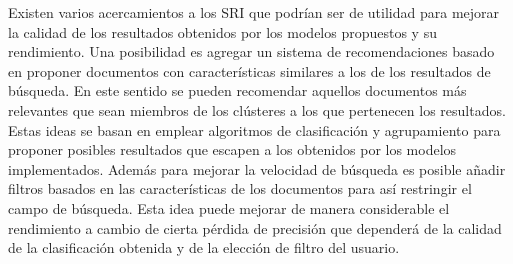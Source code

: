 \documentclass[12pt]{llncs}
\begin{document}
Existen varios acercamientos a los SRI que podrían ser de utilidad para mejorar la calidad de los resultados obtenidos por los modelos propuestos y su rendimiento. Una posibilidad es agregar un sistema de recomendaciones basado en proponer documentos con características similares a los de los resultados de búsqueda. En este sentido se pueden recomendar aquellos documentos más relevantes que sean miembros de los clústeres a los que pertenecen los resultados. Estas ideas se basan en emplear algoritmos de clasificación y agrupamiento para proponer posibles resultados que escapen a los obtenidos por los modelos implementados. Además para mejorar la velocidad de búsqueda es posible añadir filtros basados en las características de los documentos para así restringir el campo de búsqueda. Esta idea puede mejorar de manera considerable el rendimiento a cambio de cierta pérdida de precisión que dependerá de la calidad de la clasificación obtenida y de la elección de filtro del usuario.


 

\end{document}
